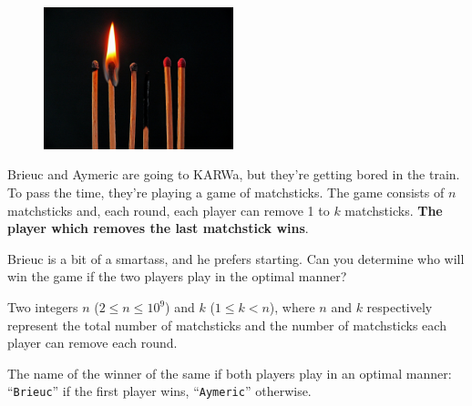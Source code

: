 \problemname{\problemyamlname}


\begin{figure}
	\centering
	\includegraphics[width=5.5cm]{allumettes.jpg}
\end{figure}
Brieuc and Aymeric are going to KARWa, but they're getting bored in the train.
To pass the time, they're playing a game of matchsticks.
The game consists of $n$ matchsticks and, each round, each player can remove 1 to $k$ matchsticks.
\textbf{The player which removes the last matchstick wins}.

Brieuc is a bit of a smartass, and he prefers starting.
Can you determine who will win the game if the two players play in the optimal manner?

\begin{Input}
	Two integers $n$ ($2 \le n \le 10^9$) and $k$ ($1 \le k < n$), where $n$ and $k$ respectively represent the total number of matchsticks and the number of matchsticks each player can remove each round.
\end{Input}

\begin{Output}
	The name of the winner of the same if both players play in an optimal manner: ``\verb|Brieuc|'' if the first player wins, ``\verb|Aymeric|'' otherwise.
\end{Output}
